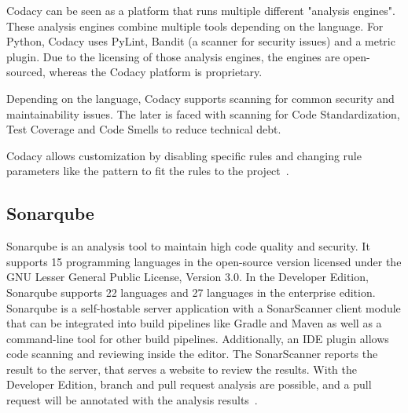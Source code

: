 Codacy can be seen as a platform that runs multiple different "analysis engines". These analysis engines combine multiple tools depending on the language. For Python, Codacy uses  PyLint, Bandit (a scanner for security issues) and a metric plugin.
Due to the licensing of those analysis engines, the engines are open-sourced, whereas the Codacy platform is proprietary.

Depending on the language, Codacy supports scanning for common security and maintainability issues. The later is faced with scanning for Code Standardization, Test Coverage and Code Smells to reduce technical debt.

Codacy allows customization by disabling specific rules and changing rule parameters like the pattern to fit the rules to the project~\cite{noauthor_codacy_nodate}. 

\subsection{Sonarqube}
Sonarqube is an analysis tool to maintain high code quality and security. It supports 15 programming languages in the open-source version licensed under the GNU Lesser General Public License, Version 3.0. In the Developer Edition, Sonarqube supports 22 languages and 27 languages in the enterprise edition. Sonarqube is a self-hostable server application with a SonarScanner client module that can be integrated into build pipelines like Gradle and Maven as well as a command-line tool for other build pipelines. Additionally, an IDE plugin allows code scanning and reviewing inside the editor. The SonarScanner reports the result to the server, that serves a website to review the results. With the Developer Edition, branch and pull request analysis are possible, and a pull request will be annotated with the analysis results~\cite{noauthor_code_nodate}.

